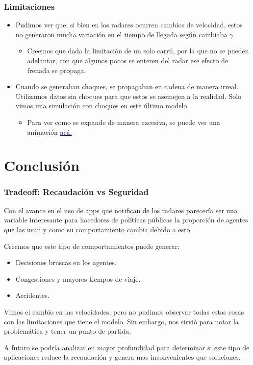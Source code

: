 \documentclass[10pt, compress]{beamer}
\begin{document}
\begin{frame}
\frametitle{Limitaciones}

\begin{itemize}
\item Pudimos ver que, si bien en los radares ocurren cambios de velocidad, estos no generaron mucha variaci\'on en el tiempo de llegada seg\'un cambiaba $\gamma$. 
	\begin{itemize}
	\item Creemos que dada la limitaci\'on de un solo carril, por la que no se pueden adelantar, con que algunos pocos se enteren del radar ese efecto de frenada se propaga.
	\end{itemize}
\item Cuando se generaban choques, se propagaban en cadena de manera irreal. Utilizamos datos sin choques para que estos se asemejen a la realidad. Solo vimos una simulaci\'on con choques en este \'ultimo modelo.
	\begin{itemize}
	\item Para ver como se expande de manera excesiva, se puede ver una animaci\'on \href{https://www.youtube.com/watch?v=Yan5BorT-o0}{\textcolor{blue}{ac\'a.}}
	\end{itemize}
\end{itemize}

\end{frame}


\section{Conclusi\'on}

\begin{frame}
\frametitle{Tradeoff: Recaudaci\'on vs Seguridad}
Con el avance en el uso de apps que notifican de los radares parecer\'ia ser una variable interesante para hacedores de pol\'iticas p\'ublicas la proporci\'on de agentes que las usan y como su comportamiento cambia debido a esto.

Creemos que este tipo de comportamientos puede generar:

\begin{itemize}
\item Decisiones bruscas en los agentes.
\item Congestiones y mayores tiempos de viaje.
\item Accidentes.
\end{itemize}

Vimos el cambio en las velocidades, pero no pudimos observar todas estas cosas con las limitaciones que tiene el modelo. Sin embargo, nos sirvi\'o para notar la problem\'atica y tener un punto de partida.

A futuro se podr\'ia analizar en mayor profundidad para determinar si este tipo de aplicaciones reduce la recaudaci\'on y genera mas inconvenientes que soluciones.

\end{frame}
\end{document}

